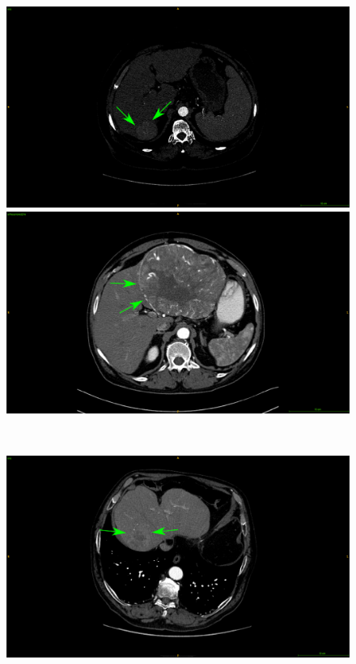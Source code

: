 \documentclass[]{article}
\begin{document}
\begin{figure}[!h]
\begin{minipage}{0.45\linewidth}
	\end{minipage} \\
	\begin{minipage}{0.45\linewidth}
		\includegraphics[width=\linewidth]{../Contributions/images/ImagingTraits/ResizeGDB_smoothMargins}
	\end{minipage} \hspace{-0.1cm}
	\begin{minipage}{0.45\linewidth}
		\includegraphics[width=\linewidth]{../Contributions/images/ImagingTraits/ResizeTCIA_smoothMargins}
	\end{minipage} \\
	\begin{minipage}{0.45\linewidth}
		\includegraphics[width=\linewidth]{../Contributions/images/ImagingTraits/ResizeGDB_nonSmoothMargins}

\end{minipage}
\end{figure}
\end{document}
